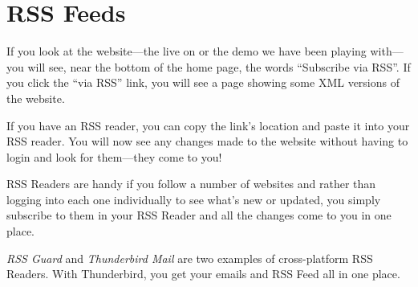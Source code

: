 \chapter{RSS Feeds}\label{chap: RSS Feeds}

If you look at the website---the live on or the demo we have been playing with---you will see, near the bottom of the home page, the words ``Subscribe via RSS''. If you click the ``via RSS'' link, you will see a page showing some XML versions of the website.

If you have an RSS reader, you can copy the link's location and paste it into your RSS reader. You will now see any changes made to the website without having to login and look for them---they come to you!

RSS Readers are handy if you follow a number of websites and rather than logging into each one individually to see what's new or updated, you simply subscribe to them in your RSS Reader and all the changes come to you in one place.

\emph{RSS Guard} and \emph{Thunderbird Mail} are two examples of cross-platform RSS Readers. With Thunderbird, you get your emails and RSS Feed all in one place.